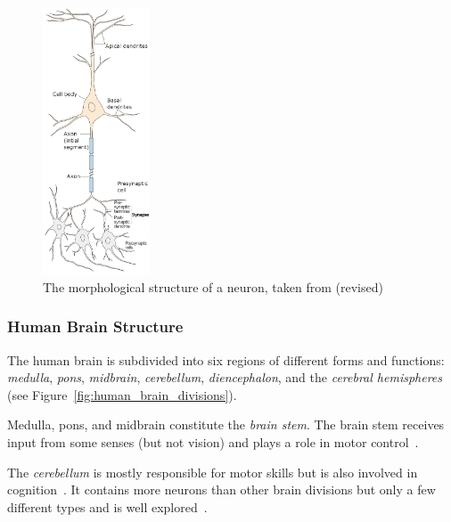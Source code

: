 \setcounter{figure}{1}
\begin{figure}
    \begin{center}
        \includegraphics[width=0.28\textwidth]{images/neuron.jpeg}
    \end{center}
    \caption[Neuron structure]{The morphological structure of a neuron, taken from \citet[p. 22]{mack2013principles} (revised)}
    \label{fig:neuron_structure}
\end{figure}

\subsubsection{Human Brain Structure}

The human brain is subdivided into six regions of different forms and functions: \textit{medulla}, \textit{pons}, \textit{midbrain}, \textit{cerebellum}, \textit{diencephalon}, and the \textit{cerebral hemispheres}~\citep[p. 340]{mack2013principles} (see Figure~\ref{fig:human_brain_divisions}).

Medulla, pons, and midbrain constitute the \textit{brain stem}.
The brain stem receives input from some senses (but not vision) and plays a role in motor control~\citep[p. 341]{mack2013principles}.

The \textit{cerebellum} is mostly responsible for motor skills but is also involved in cognition~\citep[p. 341]{mack2013principles}.
It contains more neurons than other brain divisions but only a few different types and is well explored~\citep[p. 341]{mack2013principles}.


